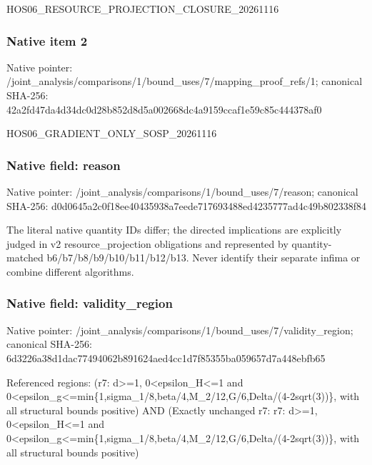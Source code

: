 \documentclass[10pt,a4paper]{article}
\begin{document}
\begingroup\raggedright\sloppy HOS06\_\allowbreak{}RESOURCE\_\allowbreak{}PROJECTION\_\allowbreak{}CLOSURE\_\allowbreak{}20261116\par\endgroup

\subsubsection{Native item 2}
Native pointer: /joint\_\allowbreak{}analysis/comparisons/1/bound\_\allowbreak{}uses/7/mapping\_\allowbreak{}proof\_\allowbreak{}refs/1; canonical SHA-256: 42a2fd47da4d34dc0d28b852d8d5a002668dc4a9159ccaf1e59c85c444378af0

\begingroup\raggedright\sloppy HOS06\_\allowbreak{}GRADIENT\_\allowbreak{}ONLY\_\allowbreak{}SOSP\_\allowbreak{}20261116\par\endgroup

\subsubsection{Native field: reason}
Native pointer: /joint\_\allowbreak{}analysis/comparisons/1/bound\_\allowbreak{}uses/7/reason; canonical SHA-256: d0d0645a2c0f18ee40435938a7eede717693488ed4235777ad4c49b802338f84

\begingroup\raggedright\sloppy The literal native quantity IDs differ;\allowbreak{} the directed implications are explicitly judged in v2 resource\_\allowbreak{}projection obligations and represented by quantity-matched b6/\allowbreak{}b7/\allowbreak{}b8/\allowbreak{}b9/\allowbreak{}b10/\allowbreak{}b11/\allowbreak{}b12/\allowbreak{}b13. Never identify their separate infima or combine different algorithms.\par\endgroup

\subsubsection{Native field: validity\_\allowbreak{}region}
Native pointer: /joint\_\allowbreak{}analysis/comparisons/1/bound\_\allowbreak{}uses/7/validity\_\allowbreak{}region; canonical SHA-256: 6d3226a38d1dac77494062b891624aed4cc1d7f85355ba059657d7a448ebfb65

\begingroup\raggedright\sloppy Referenced regions:\allowbreak{} (r7:\allowbreak{} d>=\allowbreak{}1,\allowbreak{} 0<epsilon\_\allowbreak{}H<=\allowbreak{}1 and 0<epsilon\_\allowbreak{}g<=\allowbreak{}min\{1,\allowbreak{}sigma\_\allowbreak{}1/\allowbreak{}8,\allowbreak{}beta/\allowbreak{}4,\allowbreak{}M\_\allowbreak{}2/\allowbreak{}12,\allowbreak{}G/\allowbreak{}6,\allowbreak{}Delta/\allowbreak{}(4-2sqrt(3))\},\allowbreak{} with all structural bounds positive) AND (Exactly unchanged r7:\allowbreak{} r7:\allowbreak{} d>=\allowbreak{}1,\allowbreak{} 0<epsilon\_\allowbreak{}H<=\allowbreak{}1 and 0<epsilon\_\allowbreak{}g<=\allowbreak{}min\{1,\allowbreak{}sigma\_\allowbreak{}1/\allowbreak{}8,\allowbreak{}beta/\allowbreak{}4,\allowbreak{}M\_\allowbreak{}2/\allowbreak{}12,\allowbreak{}G/\allowbreak{}6,\allowbreak{}Delta/\allowbreak{}(4-2sqrt(3))\},\allowbreak{} with all structural bounds positive)\par\endgroup
\end{document}
